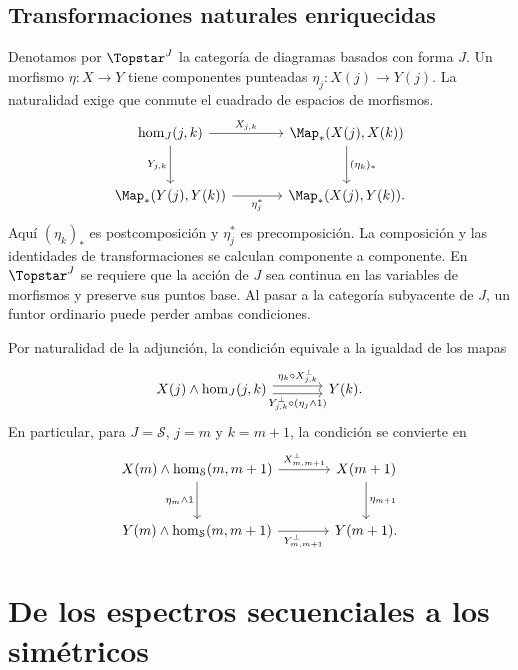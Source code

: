 \subsection{Transformaciones naturales enriquecidas}

Denotamos por $\Topstar^J$ la categoría de diagramas basados con forma $J$. Un morfismo $\eta\colon X\to Y$ tiene componentes punteadas $\eta_j\colon X(j)\to Y(j)$. La naturalidad exige que conmute el cuadrado de espacios de morfismos.
\[
\begin{tikzcd}[column sep=large,row sep=large]
\hom_J(j,k)\arrow[r,"X_{j,k}"]\arrow[d,"Y_{j,k}"']&
\Map_*(X(j),X(k))\arrow[d,"(\eta_k)_*"]\\
\Map_*(Y(j),Y(k))\arrow[r,"\eta_j^*"']&\Map_*(X(j),Y(k)).
\end{tikzcd}
\]
Aquí $(\eta_k)_*$ es postcomposición y $\eta_j^*$ es precomposición. La composición y las identidades de transformaciones se calculan componente a componente. En $\Topstar^J$ se requiere que la acción de $J$ sea continua en las variables de morfismos y preserve sus puntos base. Al pasar a la categoría subyacente de $J$, un funtor ordinario puede perder ambas condiciones.

Por naturalidad de la adjunción, la condición equivale a la igualdad de los mapas
\[
\begin{tikzcd}[column sep=large]
X(j)\wedge\hom_J(j,k)
\arrow[r,shift left=.65ex,"\eta_k\circ X_{j,k}^{\perp}"]
\arrow[r,shift right=.65ex,"Y_{j,k}^{\perp}\circ(\eta_j\wedge1)"']&Y(k).
\end{tikzcd}
\]
En particular, para $J=\mathcal S$, $j=m$ y $k=m+1$, la condición se convierte en
\[
\begin{tikzcd}[column sep=large,row sep=large]
X(m)\wedge\hom_{\mathcal S}(m,m+1)
\arrow[r,"X_{m,m+1}^{\perp}"]\arrow[d,"\eta_m\wedge1"']&
X(m+1)\arrow[d,"\eta_{m+1}"]\\
Y(m)\wedge\hom_{\mathcal S}(m,m+1)
\arrow[r,"Y_{m,m+1}^{\perp}"']&Y(m+1).
\end{tikzcd}
\]
\section{De los espectros secuenciales a los simétricos}

